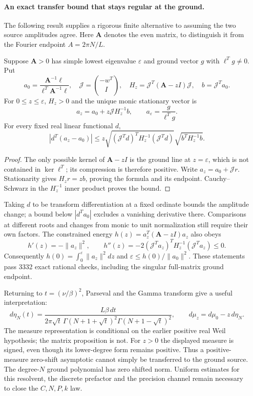 \paragraph{An exact transfer bound that stays regular at the ground.}
The following result supplies a rigorous finite alternative to assuming
the two source amplitudes agree. Here $\mathbf A$ denotes the even
matrix, to distinguish it from the Fourier endpoint $A=2\pi N/L$.
\begin{proposition}
\label{prop:monic-source-resolvent}
Suppose $\mathbf A>0$ has simple lowest eigenvalue $\varepsilon$ and
ground vector $g$ with $\ell^Tg\ne0$. Put
\[
 a_0=\frac{\mathbf A^{-1}\ell}{\ell^T\mathbf A^{-1}\ell},\quad
 \mathcal J=\binom{-w^T}{I},\quad
 H_z=\mathcal J^T(\mathbf A-zI)\mathcal J,\quad b=\mathcal J^Ta_0.
\]
For $0\leq z\leq\varepsilon$, $H_z>0$ and the unique monic stationary
vector is
\[
 a_z=a_0+z\mathcal JH_z^{-1}b,\qquad
 a_\varepsilon=\frac{g}{\ell^Tg}.
\]
For every fixed real linear functional $d$,
\[
 |d^T(a_z-a_0)|\leq z
 \sqrt{(\mathcal J^Td)^TH_z^{-1}(\mathcal J^Td)}
 \sqrt{b^TH_z^{-1}b}.
\]
\end{proposition}
\begin{proof}
The only possible kernel of $\mathbf A-zI$ is the ground line at
$z=\varepsilon$, which is not contained in $\ker\ell^T$; its compression
is therefore positive. Write $a_z=a_0+\mathcal Jr$. Stationarity gives
$H_zr=zb$, proving the formula and its endpoint. Cauchy--Schwarz in
the $H_z^{-1}$ inner product proves the bound.
\end{proof}
Taking $d$ to be transform differentiation at a fixed ordinate bounds
the amplitude change; a bound below $|d^Ta_0|$ excludes a vanishing
derivative there. Comparisons at different roots and changes from monic
to unit normalization still require their own factors. The constrained
energy $h(z)=a_z^T(\mathbf A-zI)a_z$ also obeys
\[
 h'(z)=-\|a_z\|^2,\qquad
 h''(z)=-2(\mathcal J^Ta_z)^TH_z^{-1}(\mathcal J^Ta_z)\leq0.
\]
Consequently $h(0)=\int_0^\varepsilon\|a_z\|^2dz$ and
$\varepsilon\leq h(0)/\|a_0\|^2$. These statements pass 3332 exact
rational checks, including the singular full-matrix ground endpoint.

Returning to $t=(\nu/\beta)^2$, Parseval and the Gamma transform give
a useful interpretation:
\[
 d\eta_N(t)=\frac{L\beta\,dt}
 {2\pi\sqrt t\,\Gamma(N+1+\sqrt t)^2\Gamma(N+1-\sqrt t)^2},
 \qquad d\mu_z=d\mu_0-z\,d\eta_N.
\]
The measure representation is conditional on the earlier positive real
Weil hypothesis; the matrix proposition is not. For $z>0$ the displayed
measure is signed, even though its lower-degree form remains positive.
Thus a positive-measure zero-shift asymptotic cannot simply be transferred
to the ground source. The degree-$N$ ground polynomial has zero shifted
norm. Uniform estimates for this resolvent, the discrete prefactor and
the precision channel remain necessary to close the $C,N,P,k$ law.
